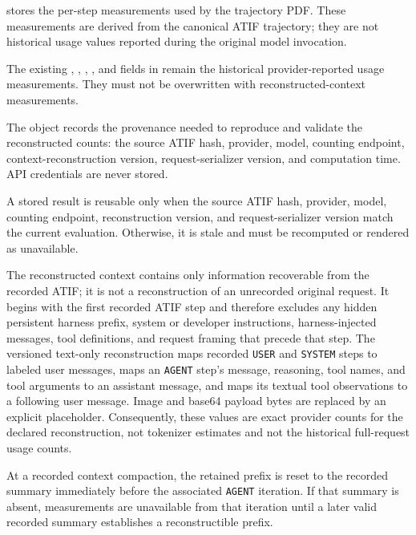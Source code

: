 \documentclass[11pt]{article}
\begin{document}
 stores the per-step measurements used by the trajectory PDF.
These measurements are derived from the canonical ATIF trajectory; they are not historical usage values reported during the original model invocation.

The existing , , , , and  fields in  remain the historical provider-reported usage measurements.
They must not be overwritten with reconstructed-context measurements.

The  object records the provenance needed to reproduce and validate the reconstructed counts: the source ATIF hash, provider, model, counting endpoint, context-reconstruction version, request-serializer version, and computation time.
API credentials are never stored.

A stored result is reusable only when the source ATIF hash, provider, model, counting endpoint, reconstruction version, and request-serializer version match the current evaluation.
Otherwise, it is stale and must be recomputed or rendered as unavailable.

The reconstructed context contains only information recoverable from the recorded ATIF; it is not a reconstruction of an unrecorded original request.
It begins with the first recorded ATIF step and therefore excludes any hidden persistent harness prefix, system or developer instructions, harness-injected messages, tool definitions, and request framing that precede that step.
The versioned text-only reconstruction maps recorded \texttt{USER} and \texttt{SYSTEM} steps to labeled user messages, maps an \texttt{AGENT} step's message, reasoning, tool names, and tool arguments to an assistant message, and maps its textual tool observations to a following user message.
Image and base64 payload bytes are replaced by an explicit placeholder.
Consequently, these values are exact provider counts for the declared reconstruction, not tokenizer estimates and not the historical full-request usage counts.

At a recorded context compaction, the retained prefix is reset to the recorded summary immediately before the associated \texttt{AGENT} iteration.
If that summary is absent, measurements are unavailable from that iteration until a later valid recorded summary establishes a reconstructible prefix.
\end{document}
